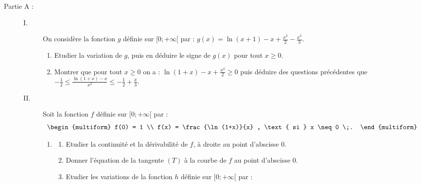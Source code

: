       \begin{description}
            \item[Partie A :]
                  \begin{description}
                        \item[I. ] \label{quest: Bac 2007 Fonction I}
                              On consid\`ere la fonction $g$ d\'efinie sur $[0;+\infty[$ par : 
                              $g(x) = \ln (x+1) - x + \frac{x^2}{2} - \frac{x^3}{3}$.
                              \begin{enumerate}
                                    \item Etudier la variation de $g$, puis en d\'eduire le signe de $g(x)$ pour tout $x \geq 0$.
                                    \item Montrer que pour tout $x \geq 0$ on a : \label{quest: Bac 2007 Fonction II 2/}
                                          $\ln (1+x) - x + \frac{x^2}{2} \geq 0$ puis d\'eduire des questions pr\'ec\'edentes que
                                          $-\frac{1}{2} \leq \frac{\ln (1+x) - x}{x^2} \leq -\frac{1}{2} + \frac{x}{3}$.
                              \end{enumerate}
                        \item[II. ]
                              Soit la fonction $f$ d\'efinie sur $[0;+\infty[$ par : 
                              \[
                                    \begin{multiform}
                                          f(0) = 1 \\
                                          f(x) = \frac{\ln (1+x)}{x} , \text{ si } x \neq 0 \;.
                                    \end{multiform}
                              \]
                              \begin{enumerate}
                                    \item \begin{enumerate}
                                                \item Etudier la continuit\'e et la d\'erivabilit\'e de $f$, \`a droite 
                                                      au point d'abscisse $0$.
                                                \item Donner l'\'equation de la tangente $(T)$ \`a la courbe de $f$ au 
                                                      point d'abscisse $0$.
                                                \item Etudier les variations de la fonction $h$ d\'efinie sur $[0;+\infty[$ par :

\end{enumerate}
\end{enumerate}
\end{description}
\end{description}
